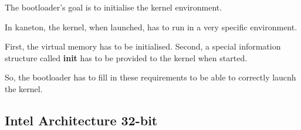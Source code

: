 \documentclass[10pt,a4wide]{article}
\begin{document}
The bootloader's goal is to initialise the kernel environment.

In kaneton, the kernel, when launched, has to run in a very specific
environment.

First, the virtual memory has to be initialised. Second, a special
information structure called \textbf{init} has to be provided to
the kernel when started.

So, the bootloader has to fill in these requirements to be able
to correctly laucnh the kernel.

\subsection{Intel Architecture 32-bit}
\end{document}
